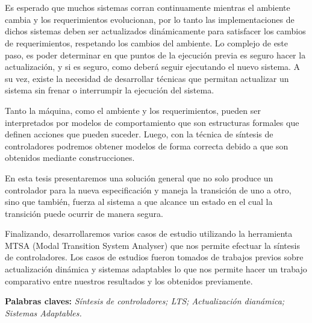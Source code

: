 \chapter*{\runtitulo}

\noindent Es esperado que muchos sistemas corran continuamente mientras el ambiente cambia y los requerimientos
evolucionan, por lo tanto las implementaciones de dichos sistemas deben ser actualizados dinámicamente para satisfacer
los cambios de requerimientos, respetando los cambios del ambiente. Lo complejo de este paso, es poder determinar en que
puntos de la ejecución previa es seguro hacer la actualización, y si es seguro, como deberá seguir ejecutando el nuevo
sistema. A su vez, existe la necesidad de desarrollar técnicas que permitan actualizar un sistema sin frenar o
interrumpir la ejecución del sistema.

\noindent Tanto la máquina, como el ambiente y los requerimientos, pueden ser interpretados por modelos de
comportamiento que son estructuras formales que definen acciones que pueden suceder. Luego, con la técnica de síntesis de
controladores podremos obtener modelos de forma correcta debido a que son obtenidos mediante construcciones.

\noindent En esta tesis presentaremos una solución general que no solo produce un controlador para la nueva
especificación y maneja la transición de uno a otro, sino que también, fuerza al sistema a que alcance un estado en el
cual la transición puede ocurrir de manera segura.

\noindent Finalizando, desarrollaremos varios casos de estudio utilizando la herramienta MTSA (Modal Transition System
Analyser) que nos permite efectuar la síntesis de controladores. Los casos de estudios fueron tomados de trabajos
previos sobre actualización dinámica y sistemas adaptables lo que nos permite hacer un trabajo comparativo entre
nuestros resultados y los obtenidos previamente.

 
\bigskip

\noindent\textbf{Palabras claves:} \textit{Síntesis de controladores; LTS; Actualización dianámica; Sistemas Adaptables.}
